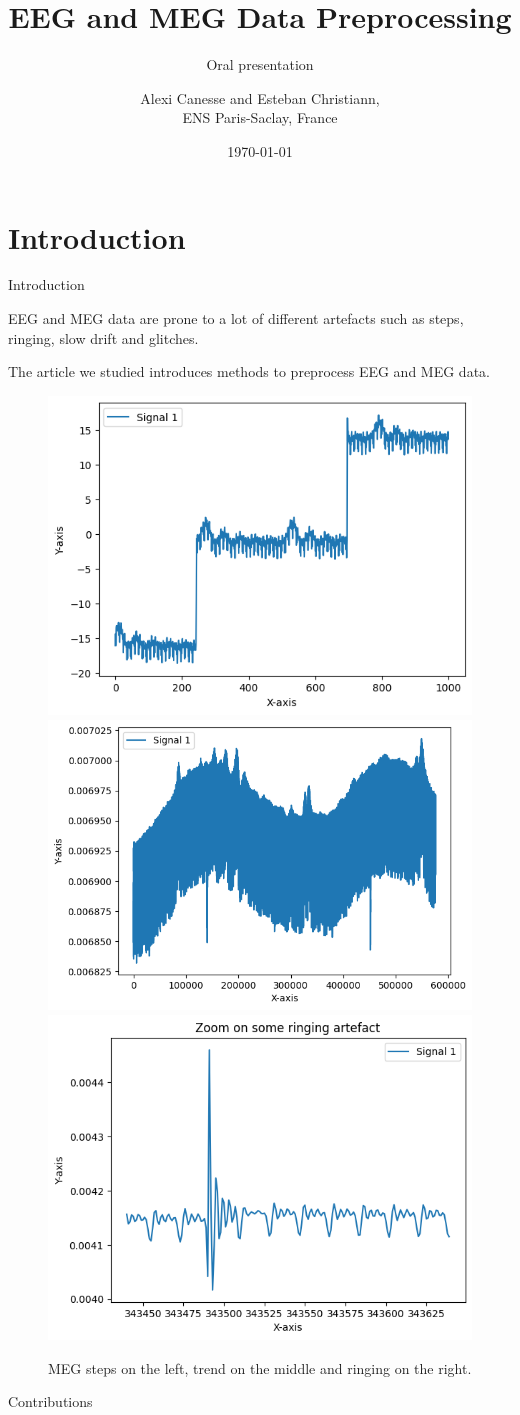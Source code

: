 \documentclass[10pt,serif]{beamer}
\title[] %
{EEG and MEG Data Preprocessing}
\subtitle{Oral presentation}
\author[Esteban Christiann, Alexi Canesse]{{Alexi \sc Canesse} and {Esteban \sc Christiann},\\ ENS Paris-Saclay, France}
\institute[] %
{
    Project for the time series course\\
    Part of the MVA program at ENS Paris-Saclay.\\
}
\date[Oral presentation] %
{\today}
\begin{document}
% 


\begin{frame}
  \titlepage
\end{frame}

\section[\color{white} Introduction]{Introduction}\label{sec:introduction}

\begin{frame}{Introduction}

  EEG and MEG data are prone to a lot of different artefacts such as steps, ringing, slow drift and glitches.

  The article we studied introduces methods to preprocess EEG and MEG data.

  \begin{figure}
    \centering
    \includegraphics[width=.3\textwidth]{figures/steps_exemple}
    \hfill
    \includegraphics[width=.3\textwidth]{figures/trend_exemple}
    \hfill
    \includegraphics[width=.3\textwidth]{figures/ringing_exemple.png}
    \caption{MEG steps on the left, trend on the middle and ringing on the right.}
\end{figure}

\end{frame}

\begin{frame}{Contributions}

\end{frame}
\end{document}
